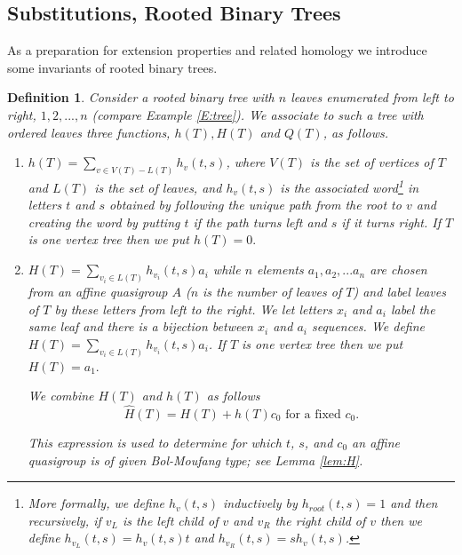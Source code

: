 \documentclass[11pt]{amsart}
\newtheorem{definition}[theorem]{Definition}
\theoremstyle{definition}
\begin{document}

\subsection{Substitutions, Rooted Binary Trees} \label{sec:substitutions}
As a preparation for extension properties and related homology we introduce some invariants of rooted binary trees.


\begin{definition}\label{def:polynomials}
Consider a rooted binary tree with $n$ leaves enumerated from left to right, $1,2,...,n$ (compare Example \ref{E:tree}). We associate to such a tree with ordered leaves three functions, $h(T),H(T)$ and $Q(T)$, as follows.
\begin{enumerate}
\item[(h)] $h(T)=\sum_{v\in V(T)-L(T)} h_v(t,s)$,  where $V(T)$ is the set of vertices of $T$ and $L(T)$ is the set of leaves, and $h_v(t,s)$ is the associated word\footnote{
More formally, we define $h_v(t,s)$ inductively by $h_{root}(t,s)=1$ and then recursively, if $v_L$ is the left child of $v$ and $v_R$ the right child of $v$ then we define $h_{v_L}(t,s)= h_v(t,s) t$ and $h_{v_R}(t,s)=sh_v(t,s)$.} in letters $t$ and $s$ obtained by following the unique path from the root to $v$ and creating the word by putting $t$ if the path turns left and $s$ if it turns right. If $T$ is one vertex tree then we put $h(T)=0.$
\item[(H)] $H(T)= \sum_{v_i\in L(T)}h_{v_i}(t,s)a_i$ while $n$ elements $a_1,a_2,...a_n$ are chosen from an affine quasigroup $A$ ($n$ is the number of leaves of $T$)  and 
label leaves of $T$ by these letters from left to the right. We let letters $x_i$ and $a_i$ label the same leaf and there is a bijection between $x_i$ and $a_i$ sequences.
We define $H(T)= \sum_{v_i\in L(T)}h_{v_i}(t,s)a_i$. 
If $T$ is one vertex tree then we put $H(T)=a_1.$

We combine $H(T)$ and $h(T)$  as follows
$$\hat H(T)= H(T)+h(T)c_0 \mbox{ for a fixed $c_0$}.$$ 

This expression is used to determine for which $t$, $s$, and $c_0$ an affine quasigroup is of given Bol-Moufang type; see Lemma \ref{lem:H}.


\end{enumerate}
\end{definition}
\end{document}
